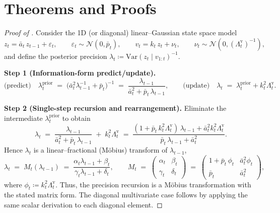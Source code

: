 \documentclass{article}
\begin{document}
\section{Theorems and Proofs}
\label{app:theorems-proofs}
\ThMobius*
\begin{mdframed}
\begin{proof}[Proof of ]
Consider the 1D (or diagonal) linear--Gaussian state space model
\[
z_t = \bar{a}_t\,z_{t-1} + \varepsilon_t,\qquad \varepsilon_t \sim \mathcal N(0,\bar{p}_t),\qquad
v_t = k_t\,z_t + \nu_t,\qquad \nu_t \sim \mathcal N(0,(\Lambda_t^{\mathrm{v}})^{-1}),
\]
and define the posterior precision
$\lambda_{t} \coloneqq \mathrm{Var}(z_t\mid v_{1:t})^{-1}$.

\textbf{Step 1 (Information-form predict/update).}
\[
\text{(predict)}\quad
\lambda_{t}^{\mathrm{prior}} \;=\; \bigl(\bar{a}_t^2 \lambda_{t-1}^{-1} + \bar{p}_t\bigr)^{-1}
\;=\;
\frac{\lambda_{t-1}}{\bar{a}_t^2 + \bar{p}_t\,\lambda_{t-1}},
\qquad
\text{(update)}\quad
\lambda_t \;=\; \lambda_t^{\mathrm{prior}} + k_t^2 \Lambda_t^{\mathrm{v}}.
\]

\textbf{Step 2 (Single-step recursion and rearrangement).}
Eliminate the intermediate $\lambda_t^{\mathrm{prior}}$ to obtain
\[
\lambda_t
\;=\;
\frac{\lambda_{t-1}}{\bar{a}_t^2 + \bar{p}_t\,\lambda_{t-1}}
\;+\;
k_t^2 \Lambda_t^{\mathrm{v}}
\;=\;
\frac{(1 + \bar{p}_t\,k_t^2 \Lambda_t^{\mathrm{v}})\,\lambda_{t-1} + \bar{a}_t^2 k_t^2 \Lambda_t^{\mathrm{v}}}{\bar{p}_t\,\lambda_{t-1} + \bar{a}_t^2}.
\]
Hence $\lambda_t$ is a linear--fractional (M\"{o}bius) transform of $\lambda_{t-1}$,
\[
\lambda_t \;=\; M_t(\lambda_{t-1})
\;=\;
\frac{\alpha_t \lambda_{t-1} + \beta_t}{\gamma_t \lambda_{t-1} + \delta_t},
\qquad
M_t \;=\;
\begin{pmatrix}
\alpha_t & \beta_t \\ \gamma_t & \delta_t
\end{pmatrix}
\;=\;
\begin{pmatrix}
1 + \bar{p}_t\,\phi_t & \bar{a}_t^2 \phi_t \\
\bar{p}_t & \bar{a}_t^2
\end{pmatrix},
\]
where $\phi_t \coloneqq k_t^2 \Lambda_t^{\mathrm{v}}$. Thus, the precision recursion is a M\"{o}bius transformation with the stated matrix form.
The diagonal multivariate case follows by applying the same scalar derivation to each diagonal element.

\end{proof}
\end{mdframed}
\end{document}
